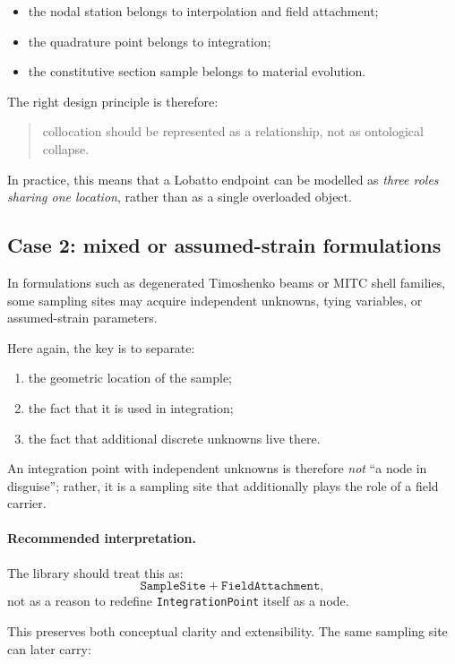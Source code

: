 \begin{itemize}[nosep]
  \item the nodal station belongs to interpolation and field attachment;
  \item the quadrature point belongs to integration;
  \item the constitutive section sample belongs to material evolution.
\end{itemize}

The right design principle is therefore:

\begin{quote}
collocation should be represented as a relationship, not as ontological
collapse.
\end{quote}

In practice, this means that a Lobatto endpoint can be modelled as
\emph{three roles sharing one location}, rather than as a single overloaded
object.


\subsection{Case 2: mixed or assumed-strain formulations}

In formulations such as degenerated Timoshenko beams or MITC shell families,
some sampling sites may acquire independent unknowns, tying variables, or
assumed-strain parameters.

Here again, the key is to separate:

\begin{enumerate}[nosep]
  \item the geometric location of the sample;
  \item the fact that it is used in integration;
  \item the fact that additional discrete unknowns live there.
\end{enumerate}

An integration point with independent unknowns is therefore \emph{not}
``a node in disguise''; rather, it is a sampling site that additionally plays
the role of a field carrier.

\paragraph{Recommended interpretation.}
The library should treat this as:
\[
\texttt{SampleSite} + \texttt{FieldAttachment},
\]
not as a reason to redefine \texttt{IntegrationPoint} itself as a node.

This preserves both conceptual clarity and extensibility.  The same sampling
site can later carry:

